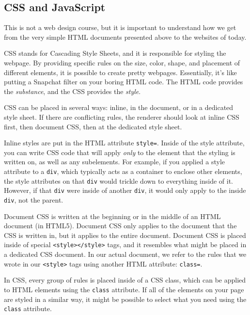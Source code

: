 \subsection{CSS and JavaScript}
This is not a web design course, but it is important to understand how we get from the very simple HTML documents presented above to the websites of today.\par
CSS stands for Cascading Style Sheets, and it is responsible for styling the webpage. By providing specific rules on the size, color, shape, and placement of different elements, it is possible to create pretty webpages. Essentially, it's like putting a Snapchat filter on your boring HTML code. The HTML code provides the \textit{substance}, and the CSS provides the \textit{style}.\par
CSS can be placed in several ways: inline, in the document, or in a dedicated style sheet. If there are conflicting rules, the renderer should look at inline CSS first, then document CSS, then at the dedicated style sheet.\par
Inline styles are put in the HTML attribute \verb|style=|. Inside of the style attribute, you can write CSS code that will apply \textit{only} to the element that the styling is written on, as well as any subelements. For example, if you applied a style attribute to a \verb|div|, which typically acts as a container to enclose other elements, the style attributes on that \verb|div| would trickle down to everything inside of it. However, if that \verb|div| were inside of another \verb|div|, it would only apply to the inside \verb|div|, not the parent.\par
{}
Document CSS is written at the beginning or in the middle of an HTML document (in HTML5). Document CSS only applies to the document that the CSS is written in, but it applies to the entire document. Document CSS is placed inside of special \verb|<style></style>| tags, and it resembles what might be placed in a dedicated CSS document. In our actual document, we refer to the rules that we wrote in our \verb|<style>| tags using another HTML attribute: \verb|class=|.\par
{}
In CSS, every group of rules is placed inside of a CSS class, which can be applied to HTML elements using the \verb|class| attribute. If all of the elements on your page are styled in a similar way, it might be possible to select what you need using the \verb|class| attribute.


